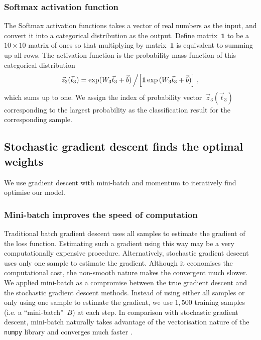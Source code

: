 \subsubsection{Softmax activation function}
The Softmax activation functions takes a vector of real numbers as the input, and convert it into a categorical distribution as the output. Define matrix~$\mathbf 1$ to be a $10\times 10$ matrix of ones so that multiplying by matrix~$\mathbf 1$ is equivalent to summing up all rows. The activation function is the probability mass function of this categorical distribution
\begin{equation}
     \vec z_{3}(\vec t_3)={\exp(W_3 \vec t_{3}+\vec b)}\left/\left[{\mathbf 1\exp{(W_3 \vec t_{3}+\vec b)}}\right]\right.,
\end{equation}
which sums up to one. We assign the index of probability vector~$\vec z_{3}(\vec t_3)$ corresponding to the largest probability as the classification result for the corresponding sample.

\subsection{Stochastic gradient descent finds the optimal weights}
We use gradient descent with mini-batch and momentum to iteratively find optimise our model.
\subsubsection{Mini-batch improves the speed of computation \label{sec:minibatch}}
Traditional batch gradient descent uses all samples to estimate the gradient of the loss function. Estimating such a gradient using this way may be a very computationally expensive procedure. Alternatively, stochastic gradient descent uses only one sample to estimate the gradient. Although it economises the computational cost, the non-smooth nature makes the convergent much slower. 
We applied mini-batch as a compromise between the true gradient descent and the stochastic gradient descent methods. 
Instead of using either all samples or only using one sample to estimate the gradient, we use $1,500$ training samples (i.e. a ``mini-batch''~$B$) at each step. 
In comparison with stochastic gradient descent, mini-batch naturally takes advantage of the vectorisation nature of the \texttt{numpy} library and converges much faster \citep{DBLP:journals/corr/GoyalDGNWKTJH17}.

